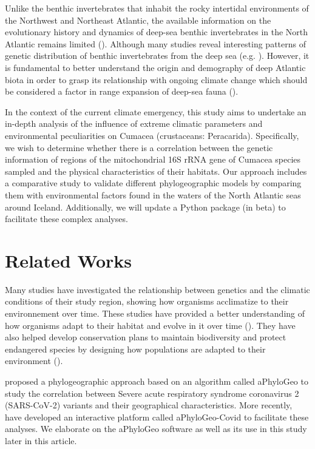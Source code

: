 Unlike the benthic invertebrates that inhabit the rocky intertidal environments of the Northwest and Northeast Atlantic, the available information on the evolutionary history and dynamics of deep-sea benthic invertebrates in the North Atlantic remains limited (\citep{jennings_phylogeographic_2014}). Although many studies reveal interesting patterns of genetic distribution of benthic invertebrates from the deep sea (e.g. \citep{wilson_historical_1998, havermans_genetic_2013}). However, it is fundamental to better understand the origin and demography of deep Atlantic biota in order to grasp its relationship with ongoing climate change which should be considered a factor in range expansion of deep-sea fauna (\citep{jennings_phylogeographic_2014}).

In the context of the current climate emergency, this study aims to undertake an in-depth analysis of the influence of extreme climatic parameters and environmental peculiarities on Cumacea (crustaceans: Peracarida). Specifically, we wish to determine whether there is a correlation between the genetic information of regions of the mitochondrial 16S rRNA gene of Cumacea species sampled and the physical characteristics of their habitats. Our approach includes a comparative study to validate different phylogeographic models by comparing them with environmental factors found in the waters of the North Atlantic seas around Iceland. Additionally, we will update a Python package (in beta) to facilitate these complex analyses.

\section{Related Works}\label{related-works}
Many studies have investigated the relationship between genetics and the climatic conditions of their study region, showing how organisms acclimatize to their environnement over time. These studies have provided a better understanding of how organisms adapt to their habitat and evolve in it over time (\citep{fc_genomic_2012}). They have also helped develop conservation plans to maintain biodiversity and protect endangered species by designing how populations are adapted to their environment (\citep{balkenhol_identifying_2009}).

\citep{koshkarov_phylogeography_2022} proposed a phylogeographic approach based on an algorithm called aPhyloGeo to study the correlation between Severe acute respiratory syndrome coronavirus 2 (SARS-CoV-2) variants and their geographical characteristics. More recently, \citep{li_aphylogeo-covid_2023} have developed an interactive platform called aPhyloGeo-Covid to facilitate these analyses.  We elaborate on the aPhyloGeo software as well as its use in this study later in this article.

